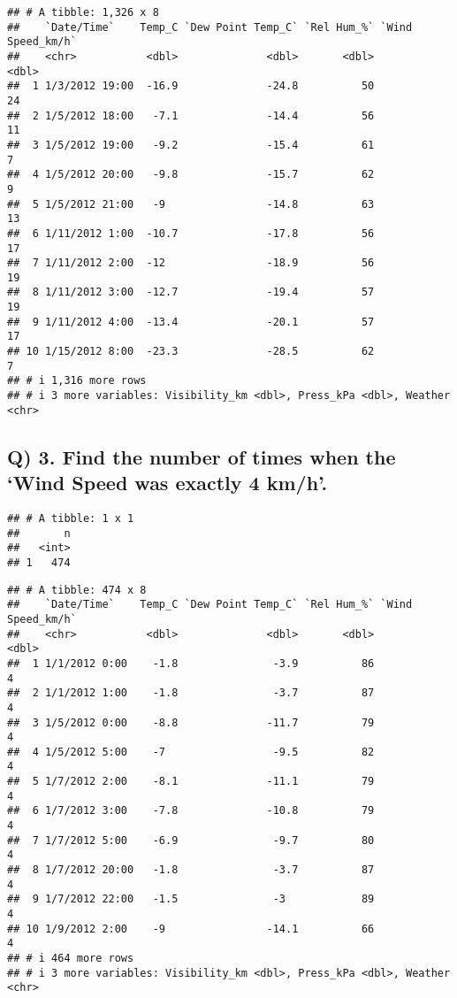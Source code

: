 \documentclass[
]{article}
\begin{document}
\begin{verbatim}
## # A tibble: 1,326 x 8
##    `Date/Time`    Temp_C `Dew Point Temp_C` `Rel Hum_%` `Wind Speed_km/h`
##    <chr>           <dbl>              <dbl>       <dbl>             <dbl>
##  1 1/3/2012 19:00  -16.9              -24.8          50                24
##  2 1/5/2012 18:00   -7.1              -14.4          56                11
##  3 1/5/2012 19:00   -9.2              -15.4          61                 7
##  4 1/5/2012 20:00   -9.8              -15.7          62                 9
##  5 1/5/2012 21:00   -9                -14.8          63                13
##  6 1/11/2012 1:00  -10.7              -17.8          56                17
##  7 1/11/2012 2:00  -12                -18.9          56                19
##  8 1/11/2012 3:00  -12.7              -19.4          57                19
##  9 1/11/2012 4:00  -13.4              -20.1          57                17
## 10 1/15/2012 8:00  -23.3              -28.5          62                 7
## # i 1,316 more rows
## # i 3 more variables: Visibility_km <dbl>, Press_kPa <dbl>, Weather <chr>
\end{verbatim}

\hypertarget{q-3.-find-the-number-of-times-when-the-wind-speed-was-exactly-4-kmh.}{%
\subsection{Q) 3. Find the number of times when the `Wind Speed was
exactly 4
km/h'.}\label{q-3.-find-the-number-of-times-when-the-wind-speed-was-exactly-4-kmh.}}

\begin{verbatim}
## # A tibble: 1 x 1
##       n
##   <int>
## 1   474
\end{verbatim}

\begin{verbatim}
## # A tibble: 474 x 8
##    `Date/Time`    Temp_C `Dew Point Temp_C` `Rel Hum_%` `Wind Speed_km/h`
##    <chr>           <dbl>              <dbl>       <dbl>             <dbl>
##  1 1/1/2012 0:00    -1.8               -3.9          86                 4
##  2 1/1/2012 1:00    -1.8               -3.7          87                 4
##  3 1/5/2012 0:00    -8.8              -11.7          79                 4
##  4 1/5/2012 5:00    -7                 -9.5          82                 4
##  5 1/7/2012 2:00    -8.1              -11.1          79                 4
##  6 1/7/2012 3:00    -7.8              -10.8          79                 4
##  7 1/7/2012 5:00    -6.9               -9.7          80                 4
##  8 1/7/2012 20:00   -1.8               -3.7          87                 4
##  9 1/7/2012 22:00   -1.5               -3            89                 4
## 10 1/9/2012 2:00    -9                -14.1          66                 4
## # i 464 more rows
## # i 3 more variables: Visibility_km <dbl>, Press_kPa <dbl>, Weather <chr>
\end{verbatim}
\end{document}
